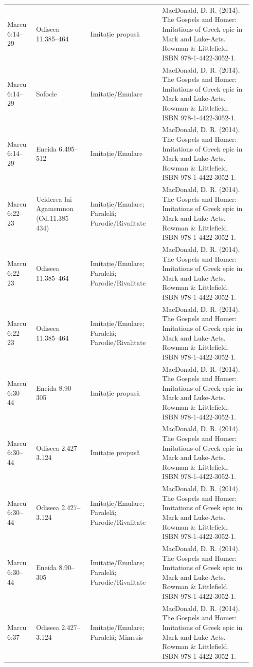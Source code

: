 \documentclass[12pt,a4paper,twoside,openany]{book}
\begin{document}
\begin{longtable}{L{1.4cm}L{1.7cm}L{3.1cm}L{8.4cm}}
Marcu 6:14–29 & Odiseea 11.385–464 & Imitație propusă & MacDonald, D. R. (2014). The Gospels and Homer: Imitations of Greek epic in Mark and Luke-Acts. Rowman \& Littlefield. ISBN 978-1-4422-3052-1. \\
Marcu 6:14–29 & Sofocle & Imitație/Emulare & MacDonald, D. R. (2014). The Gospels and Homer: Imitations of Greek epic in Mark and Luke-Acts. Rowman \& Littlefield. ISBN 978-1-4422-3052-1. \\
Marcu 6:14–29 & Eneida 6.495–512 & Imitație/Emulare & MacDonald, D. R. (2014). The Gospels and Homer: Imitations of Greek epic in Mark and Luke-Acts. Rowman \& Littlefield. ISBN 978-1-4422-3052-1. \\
Marcu 6:22–23 & Uciderea lui Agamemnon (Od.11.385–434) & Imitație/Emulare; Paralelă; Parodie/Rivalitate & MacDonald, D. R. (2014). The Gospels and Homer: Imitations of Greek epic in Mark and Luke-Acts. Rowman \& Littlefield. ISBN 978-1-4422-3052-1. \\
Marcu 6:22–23 & Odiseea 11.385–464 & Imitație/Emulare; Paralelă; Parodie/Rivalitate & MacDonald, D. R. (2014). The Gospels and Homer: Imitations of Greek epic in Mark and Luke-Acts. Rowman \& Littlefield. ISBN 978-1-4422-3052-1. \\
Marcu 6:22–23 & Odiseea 11.385–464 & Imitație/Emulare; Paralelă; Parodie/Rivalitate & MacDonald, D. R. (2014). The Gospels and Homer: Imitations of Greek epic in Mark and Luke-Acts. Rowman \& Littlefield. ISBN 978-1-4422-3052-1. \\
Marcu 6:30–44 & Eneida 8.90–305 & Imitație propusă & MacDonald, D. R. (2014). The Gospels and Homer: Imitations of Greek epic in Mark and Luke-Acts. Rowman \& Littlefield. ISBN 978-1-4422-3052-1. \\
Marcu 6:30–44 & Odiseea 2.427–3.124 & Imitație propusă & MacDonald, D. R. (2014). The Gospels and Homer: Imitations of Greek epic in Mark and Luke-Acts. Rowman \& Littlefield. ISBN 978-1-4422-3052-1. \\
Marcu 6:30–44 & Odiseea 2.427–3.124 & Imitație/Emulare; Paralelă; Parodie/Rivalitate & MacDonald, D. R. (2014). The Gospels and Homer: Imitations of Greek epic in Mark and Luke-Acts. Rowman \& Littlefield. ISBN 978-1-4422-3052-1. \\
Marcu 6:30–44 & Eneida 8.90–305 & Imitație/Emulare; Paralelă; Parodie/Rivalitate & MacDonald, D. R. (2014). The Gospels and Homer: Imitations of Greek epic in Mark and Luke-Acts. Rowman \& Littlefield. ISBN 978-1-4422-3052-1. \\
Marcu 6:37 & Odiseea 2.427–3.124 & Imitație/Emulare; Paralelă; Mimesis & MacDonald, D. R. (2014). The Gospels and Homer: Imitations of Greek epic in Mark and Luke-Acts. Rowman \& Littlefield. ISBN 978-1-4422-3052-1. \\

\end{longtable}
\end{document}
